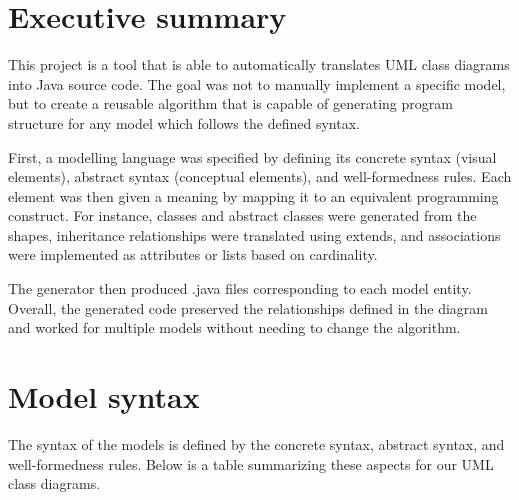 \section{Executive summary}

This project is a tool that is able to automatically translates UML class diagrams into Java source code. The goal was not to manually implement a specific model, but to create a reusable algorithm that is capable of generating program structure for any model which follows the defined syntax.

First, a modelling language was specified by defining its concrete syntax (visual elements), abstract syntax (conceptual elements), and well-formedness rules. Each element was then given a meaning by mapping it to an equivalent programming construct. For instance, classes and abstract classes were generated from the shapes, inheritance relationships were translated using extends, and associations were implemented as attributes or lists based on cardinality. 

The generator then produced .java files corresponding to each model entity. Overall, the generated code preserved the relationships defined in the diagram and worked for multiple models without needing to change the algorithm.

\newpage

\section{Model syntax}

The syntax of the models is defined by the concrete syntax, abstract syntax, and well-formedness rules. Below is a table summarizing these aspects for our UML class diagrams.

